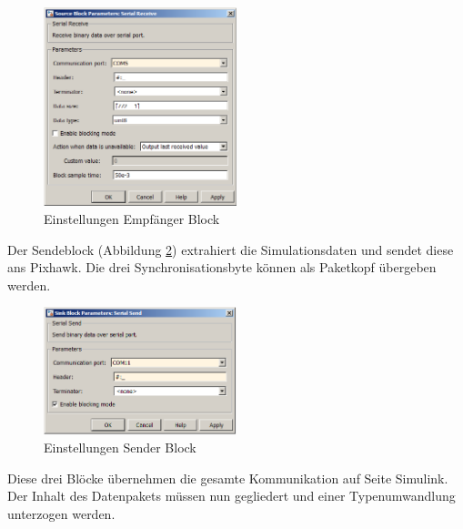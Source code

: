 \begin{figure}[H]
  \begin{center}
  \includegraphics[width=0.5\textwidth]{pic/60_simulink/conf_rcv.png}
  \caption{Einstellungen Empfänger Block}
  \label{fig:conf_rcv}
  \end{center}
\end{figure}

\noindent Der Sendeblock (Abbildung \ref{fig:conf_send}) extrahiert die  Simulationsdaten und sendet diese ans Pixhawk. Die drei Synchronisationsbyte können als Paketkopf übergeben werden.

\noindent
\begin{figure}[H]
  \begin{center}
  \includegraphics[width=0.5\textwidth]{pic/60_simulink/conf_send.png}
  \caption{Einstellungen Sender Block}
  \label{fig:conf_send}
  \end{center}
\end{figure}

\noindent Diese drei Blöcke übernehmen die gesamte Kommunikation auf Seite Simulink. Der Inhalt des Datenpakets müssen nun gegliedert  und einer Typenumwandlung unterzogen werden.

\clearpage